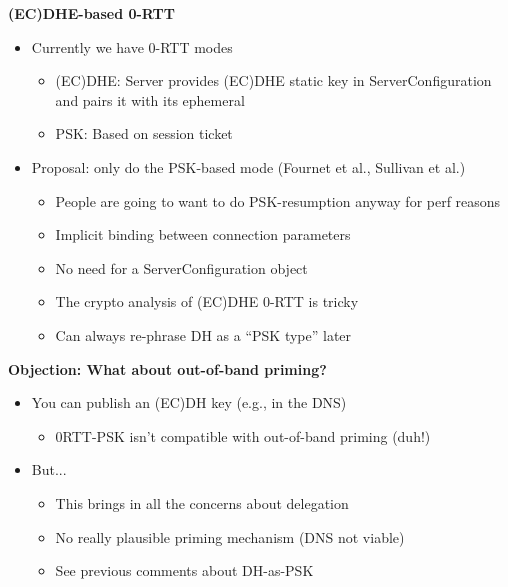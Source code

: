 \documentclass[helvetica]{seminar}
\newcommand{\heading}[1]{%
  \begin{center} 
    \large\bf 
    #1 
  \end{center} 
  \vspace{.4 in}}
\begin{document}
\begin{slide}
\heading{(EC)DHE-based 0-RTT}

\vspace{-2ex}

\begin{itemize}
\item Currently we have 0-RTT modes
  \begin{itemize}
  \item (EC)DHE: Server provides (EC)DHE static key in ServerConfiguration and pairs it with its ephemeral
  \item PSK: Based on session ticket
  \end{itemize}

\item Proposal: only do the PSK-based mode (Fournet et al., Sullivan et al.)
  \begin{itemize}
  \item People are going to want to do PSK-resumption anyway for perf reasons
  \item Implicit binding between connection parameters
  \item No need for a ServerConfiguration object
  \item The crypto analysis of (EC)DHE 0-RTT is tricky
  \item Can always re-phrase DH as a ``PSK type'' later
  \end{itemize}
\end{itemize}
\end{slide}


\begin{slide}
\heading{Objection: What about out-of-band priming?}

\begin{itemize}
\item You can publish an (EC)DH key (e.g., in the DNS)
  \begin{itemize}
  \item 0RTT-PSK isn't compatible with out-of-band priming (duh!)
  \end{itemize}

\item But...
  \begin{itemize}
  \item This brings in all the concerns about delegation
  \item No really plausible priming mechanism (DNS not viable)
  \item See previous comments about DH-as-PSK
  \end{itemize}
\end{itemize}
\end{slide}
\end{document}
